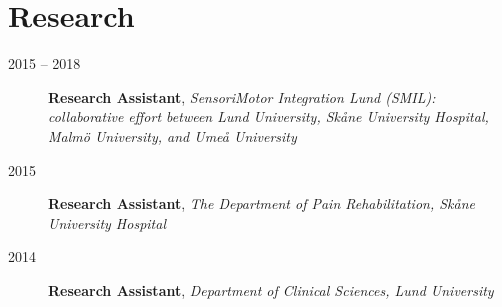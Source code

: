 \documentclass[
  10pt,
  headsepline=true,
  english,
  DIV=12
]{scrartcl}
\renewcommand*{%
  \mkbibnamegiven
}[1]{\ifitemannotation{highlight}{\textbf{#1}}{#1}}
\renewcommand*{%
  \mkbibnamefamily
}[1]{\ifitemannotation{highlight}{\textbf{#1}}{#1}}
\begin{document}






\section{Research}

\begin{description}
  \item[2015 -- 2018] {
    \textbf{Research Assistant}, \emph{SensoriMotor Integration Lund
      (SMIL): collaborative effort between Lund University, Skåne
      University
      Hospital, Malmö University, and Umeå University}
    }
  \item[2015] {
    \textbf{Research Assistant}, \emph{The Department of Pain
      Rehabilitation, Skåne University Hospital}

    }
  \item[2014] {
    \textbf{Research Assistant}, \emph{Department of Clinical Sciences,
      Lund University}

    }
\end{description}
\end{document}
